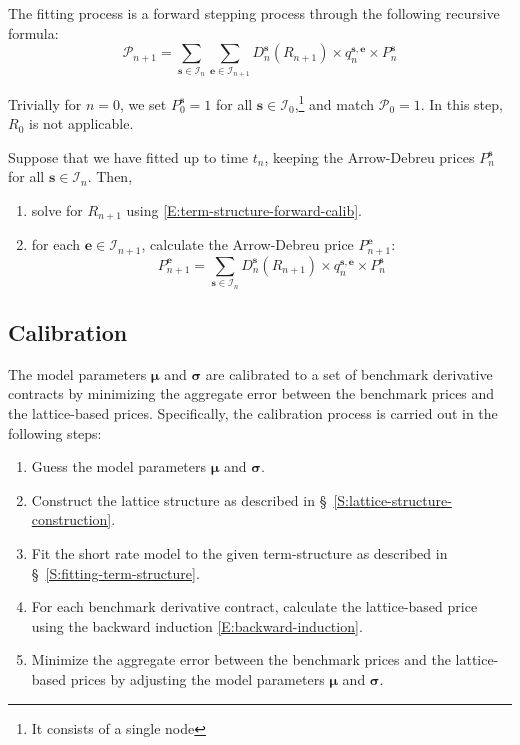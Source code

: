 \documentclass{texyise}
\newcommand{\indexset}{\mathcal{I}}
\begin{document}
The fitting process is a forward stepping process through the following recursive formula: 
\begin{equation}
    \mathcal{P}_{n+1} =  \sum_{\bm{s} \in \indexset_n}\sum_{\bm{e} \in \indexset_{n+1}} D_n^{\bm{s}}(R_{n+1}) \times q_{n}^{\bm{s},\bm{e}} \times P_n^{\bm{s}} \label{E:term-structure-forward-calib}
\end{equation}

Trivially for $n=0$, we set $P_0^{\bm{s}} = 1$ for all $\bm{s} \in \indexset_0$,\footnote{It consists of a single node} and match $\mathcal{P}_0 = 1$. In this step, $R_0$ is not applicable.

Suppose that we have fitted up to time $t_n$, keeping the Arrow-Debreu prices $P_n^{\bm{s}}$ for all $\bm{s} \in \indexset_n$. Then,
\begin{enumerate}
    \item solve for $R_{n+1}$ using \eqref{E:term-structure-forward-calib}. 
    \item for each $\bm{e} \in \indexset_{n+1}$, calculate the Arrow-Debreu price $P_{n+1}^{\bm{e}}$:
    \begin{equation}
        P_{n+1}^{\bm{e}} = \sum_{\bm{s} \in \indexset_n} D_n^{\bm{s}}(R_{n+1}) \times q_{n}^{\bm{s},\bm{e}} \times P_n^{\bm{s}}
    \end{equation}
\end{enumerate}

\subsection{Calibration}

The model parameters $\bm{\mu}$ and $\bm{\sigma}$ are calibrated to a set of benchmark derivative contracts by minimizing the aggregate error between the benchmark prices and the lattice-based prices.
Specifically, the calibration process is carried out in the following steps:
\begin{enumerate}
    \item Guess the model parameters $\bm{\mu}$ and $\bm{\sigma}$.
    \item Construct the lattice structure as described in \S~\ref{S:lattice-structure-construction}.
    \item Fit the short rate model to the given term-structure as described in \S~\ref{S:fitting-term-structure}.
    \item For each benchmark derivative contract, calculate the lattice-based price using the backward induction \eqref{E:backward-induction}.
    \item Minimize the aggregate error between the benchmark prices and the lattice-based prices by adjusting the model parameters $\bm{\mu}$ and $\bm{\sigma}$.
\end{enumerate}
\end{document}
